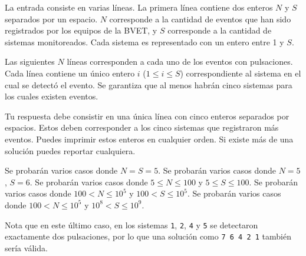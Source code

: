 \documentclass{oci}
\begin{document}
\begin{inputDescription}
La entrada consiste en varias líneas.
La primera línea contiene dos enteros $N$ y $S$ separados por un espacio.
$N$ corresponde a la cantidad de eventos que han sido registrados por los equipos de la BVET, y
$S$ corresponde a la cantidad de sistemas monitoreados.
Cada sistema es representado con un entero entre 1 y $S$.

Las siguientes $N$ líneas corresponden a cada uno de los eventos con pulsaciones.
Cada línea contiene un único entero $i$ ($1 \le i \le S$) correspondiente al sistema en el cual se detectó el evento.
Se garantiza que al menos habrán cinco sistemas para los cuales existen eventos.
\end{inputDescription}

\begin{outputDescription}
  Tu respuesta debe consistir en una única línea con cinco enteros separados por espacios.
  Estos deben corresponder a los cinco sistemas que registraron más eventos.
  Puedes imprimir estos enteros en cualquier orden.
  Si existe más de una solución puedes reportar cualquiera.
\end{outputDescription}

\begin{scoreDescription}
   Se probarán varios casos donde $N=S=5$.
   Se probarán varios casos donde $N=5$, $S=6$.
   Se probarán varios casos donde $5 \le N \le 100$ y $5 \le S \le 100$.
   Se probarán varios casos donde $100 < N \le 10^5$ y $100 < S \le 10^5$.
   Se probarán varios casos donde $100 < N \le 10^5$ y $10^8 < S \le 10^9$.
\end{scoreDescription}

\begin{sampleDescription}
\end{sampleDescription}

Nota que en este último caso, en los sistemas
\texttt{1}, \texttt{2}, \texttt{4} y \texttt{5} se detectaron exactamente dos pulsaciones, por lo que
una solución como \texttt{7 6 4 2 1} también sería válida.
\end{document}

